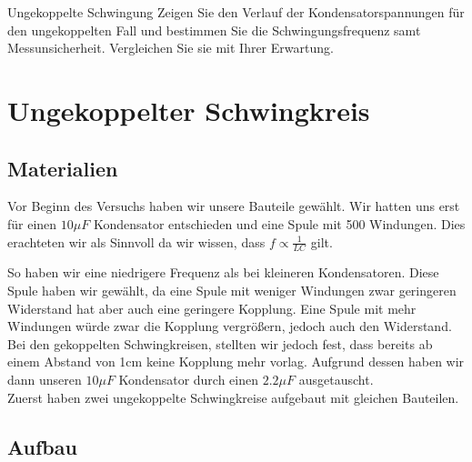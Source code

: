 \documentclass[twoside]{protokoll}
\begin{document}
\begin{aufgabe}{Ungekoppelte Schwingung}
  Zeigen Sie den Verlauf der Kondensatorspannungen für den
  ungekoppelten Fall und bestimmen Sie die Schwingungsfrequenz samt
  Messunsicherheit. Vergleichen Sie sie mit Ihrer Erwartung.
\end{aufgabe}

\section{Ungekoppelter Schwingkreis}

\subsection{Materialien}


Vor Beginn des Versuchs haben wir unsere Bauteile gewählt. Wir hatten uns erst für einen $10\mu F$ Kondensator entschieden und eine Spule mit 500 Windungen.
Dies erachteten wir als Sinnvoll da wir wissen, dass $ f \propto \frac{1}{LC}$ gilt. 

So haben wir eine niedrigere Frequenz als bei kleineren Kondensatoren. 
Diese Spule haben wir gewählt, da eine Spule mit weniger Windungen zwar geringeren Widerstand hat aber auch eine geringere Kopplung. Eine Spule mit mehr Windungen würde zwar die Kopplung vergrößern, jedoch auch den Widerstand. \\

Bei den gekoppelten Schwingkreisen, stellten wir jedoch fest, dass bereits ab einem Abstand von 1cm keine Kopplung mehr vorlag. 
Aufgrund dessen haben wir dann unseren $10\mu F$ Kondensator durch einen $2.2 \mu F$ ausgetauscht. \\


Zuerst haben zwei ungekoppelte Schwingkreise aufgebaut mit gleichen Bauteilen.
 
\subsection{Aufbau}
\end{document}
